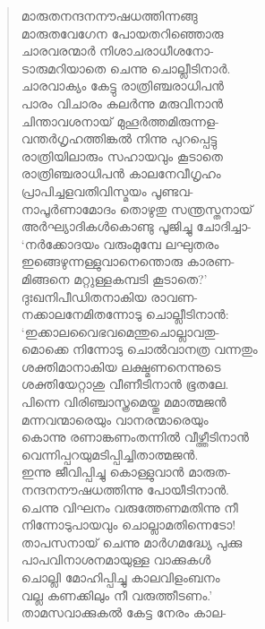 \begin{verse}
മാരുതനന്ദനനൗഷധത്തിന്നങ്ങു\\
മാരുതവേഗേന പോയതറിഞ്ഞൊരു\\
ചാരവരന്മാര്‍ നിശാചരാധീശനോ-\\
ടാരുമറിയാതെ ചെന്നു ചൊല്ലീടിനാര്‍.\\
ചാരവാക്യം കേട്ടു രാത്രിഞ്ചരാധിപന്‍\\
പാരം വിചാരം കലര്‍ന്നു മരുവിനാന്‍\\
ചിന്താവശനായ് മുഹൂര്‍ത്തമിരുന്നള-\\
വന്തര്‍ഗൃഹത്തിങ്കല്‍ നിന്നു പുറപ്പെട്ടു\\
രാത്രിയിലാരും സഹായവും കൂടാതെ\\
രാത്രിഞ്ചരാധിപന്‍ കാലനേവീഗൃഹം\\
പ്രാപിച്ചളവതിവിസ്മയം പൂണ്ടവ-\\
നാപൂര്‍ണാമോദം തൊഴുതു സന്ത്രസ്തനായ്\\
അര്‍ഘ്യാദികള്‍കൊണ്ടു പൂജിച്ചു ചോദിച്ചാ-\\
‘നര്‍ക്കോദയം വരുംമുമ്പേ ലഘുതരം\\
ഇങ്ങെഴുന്നള്ളുവാനെന്തൊരു കാരണ-\\
മിങ്ങനെ മറ്റുള്ളകമ്പടി കൂടാതെ?’\\
ദുഃഖനിപീഡിതനാകിയ രാവണ-\\
നക്കാലനേമിതന്നോടു ചൊല്ലീടിനാന്‍:\\
‘ഇക്കാലവൈഭവമെന്തുചൊല്ലാവതു-\\
മൊക്കെ നിന്നോടു ചൊല്‍വാനത്ര വന്നതും\\
ശക്തിമാനാകിയ ലക്ഷ്മണനെന്നുടെ\\
ശക്തിയേറ്റാശു വീണീടിനാന്‍ ഭൂതലേ.\\
പിന്നെ വിരിഞ്ചാസ്ത്രമെയ്തു മമാത്മജന്‍\\
മന്നവന്മാരെയും വാനരന്മാരെയും\\
കൊന്നു രണാങ്കണംതന്നില്‍ വീഴ്ത്തീടിനാന്‍\\
വെന്നിപ്പറയുമടിപ്പിച്ചിതാത്മജന്‍.\\
ഇന്നു ജീവിപ്പിച്ചു കൊള്ളുവാന്‍ മാരുത-\\
നന്ദനനൗഷധത്തിന്നു പോയീടിനാന്‍.\\
ചെന്നു വിഘനം വരുത്തേണമതിന്നു നീ\\
നിന്നോടുപായവും ചൊല്ലാമതിന്നെടോ!\\
താപസനായ് ചെന്നു മാര്‍ഗമദ്ധ്യേ പുക്കു\\
പാപവിനാശനമായുള്ള വാക്കുകള്‍\\
ചൊല്ലി മോഹിപ്പിച്ചു കാലവിളംബനം\\
വല്ല കണക്കിലും നീ വരുത്തീടണം.’\\
താമസവാക്കുകല്‍ കേട്ട നേരം കാല-\\

\end{verse}
